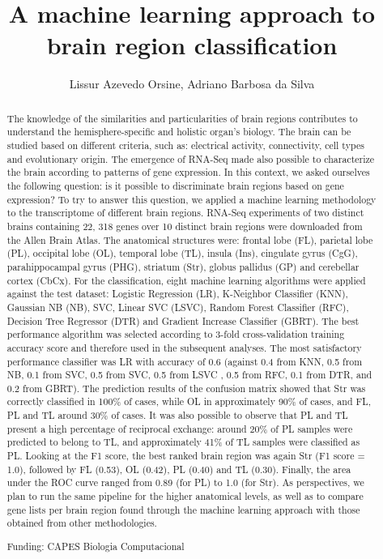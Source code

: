 \documentclass[twoside]{article}
\title{\vspace{-15mm}\fontsize{24pt}{10pt}\selectfont\textbf{ A machine learning approach to brain region classification }} %
\author{ Lissur Azevedo Orsine, Adriano Barbosa da Silva }
\affil{ Laborat\'orio de Biodados,  Universidade Federal de Minas Gerais }
\date{}
\begin{document}
  
  
  \maketitle %
  
  
  \thispagestyle{fancy} %
  
  
  \begin{abstract}
  The knowledge of the similarities and particularities of brain regions contributes to understand the hemisphere-specific and holistic organ’s biology. The brain can be studied based on different criteria,  such as: electrical activity,  connectivity,  cell types and evolutionary origin. The emergence of RNA-Seq made also possible to characterize the brain according to patterns of gene expression. In this context,  we asked ourselves the following question: is it possible to discriminate brain regions based on gene expression? To try to answer this question,  we applied a machine learning methodology to the transcriptome of different brain regions. RNA-Seq experiments of two distinct brains containing 22, 318 genes over 10 distinct brain regions were downloaded from the Allen Brain Atlas. The anatomical structures were: frontal lobe (FL),  parietal lobe (PL),  occipital lobe (OL),  temporal lobe (TL),  insula (Ins),  cingulate gyrus (CgG),  parahippocampal gyrus (PHG),  striatum (Str),  globus pallidus (GP) and cerebellar cortex (CbCx). For the classification,  eight machine learning algorithms were applied against the test dataset: Logistic Regression (LR),  K-Neighbor Classifier (KNN),  Gaussian NB (NB),  SVC,  Linear SVC (LSVC),  Random Forest Classifier (RFC),  Decision Tree Regressor (DTR) and Gradient Increase Classifier (GBRT). The best performance algorithm was selected according to 3-fold cross-validation training accuracy score and therefore used in the subsequent analyses.  The most satisfactory performance classifier was LR with accuracy of 0.6 (against 0.4 from KNN,  0.5 from NB,  0.1 from SVC,  0.5 from SVC,  0.5 from LSVC ,  0.5 from RFC,  0.1 from DTR,  and 0.2 from GBRT). The prediction results of the confusion matrix showed that Str was correctly classified in 100\% of cases,  while OL in approximately 90\% of cases,  and FL,  PL and TL around 30\% of cases. It was also possible to observe that PL and TL present a high percentage of reciprocal exchange: around 20\% of PL samples were predicted to belong to TL,  and approximately 41\% of TL samples were classified as PL. Looking at the F1 score,  the best ranked brain region was again Str (F1 score = 1.0),  followed by FL (0.53),  OL (0.42),  PL (0.40) and TL (0.30). Finally,  the area under the ROC curve ranged from 0.89 (for PL) to 1.0 (for Str).  As perspectives,  we plan to run the same pipeline for the higher anatomical levels,  as well as to compare gene lists per brain region found through the machine learning approach with those obtained from other methodologies.
  
  Funding: CAPES Biologia Computacional \\ 
  \end{abstract}
  
\end{document}
